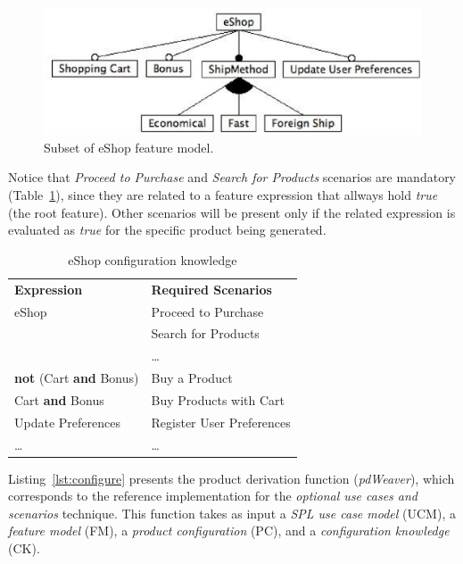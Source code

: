 \documentclass[times, 11pt,twocolumn]{article}
\begin{document}
\begin{figure}[tbh]
 \begin{center}
  \includegraphics[scale=0.40]{../images/eShop-fm-re.eps}
   \caption{Subset of eShop feature model.}
  \label{fig:eshop-fm-re}
  \end{center}
\end{figure}

Notice that \emph{Proceed to Purchase} and \emph{Search for Products} scenarios
are mandatory (Table~\ref{tab:ck-running-example}), since they are related to a feature
expression that allways hold \emph{true} (the root feature). Other scenarios
will be present only if the related expression is evaluated as \emph{true} for
the specific product being generated.

\begin{table}[bth]
\begin{center}
 \caption{eShop configuration knowledge}
\label{tab:ck-running-example}
\begin{tabular}{ll}
   \hline\noalign{\smallskip}
  {\bf Expression} & {\bf Required Scenarios} \\
   \noalign{\smallskip}
   \hline
   \noalign{\smallskip}
    eShop & Proceed to Purchase \\
               & Search for Products \\
               & \ldots \\ 
    {\bf not} (Cart {\bf and} Bonus)\hspace{2pt} & Buy a Product \\ 
    Cart {\bf and} Bonus & Buy Products with Cart \\ 
    Update Preferences & Register User Preferences	 \\  
    \ldots & \ldots \\ 
  \hline
\end{tabular}
\end{center}
\end{table}

Listing~\ref{lst:configure} presents the product derivation function
(\emph{pdWeaver}), which corresponds to the reference implementation for
the \emph{optional use cases and scenarios} technique. This function takes as
input a \emph{SPL use case model} (UCM), a \emph{feature model} (FM), a \emph{product
configuration} (PC), and a \emph{configuration knowledge} (CK).
\end{document}
